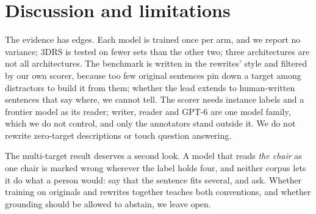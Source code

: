 \section{Discussion and limitations}
\label{sec:discussion}

The evidence has edges.
Each model is trained once per arm, and we report no variance; 3DRS is tested on fewer sets than the other two; three architectures are not all architectures.
The benchmark is written in the rewrites' style and filtered by our own scorer, because too few original sentences pin down a target among distractors to build it from them; whether the lead extends to human-written sentences that say where, we cannot tell.
The scorer needs instance labels and a frontier model as its reader; writer, reader and GPT-6 are one model family, which we do not control, and only the annotators stand outside it.
We do not rewrite zero-target descriptions or touch question answering.

The multi-target result deserves a second look.
A model that reads \emph{the chair} as one chair is marked wrong wherever the label holds four, and neither corpus lets it do what a person would: say that the sentence fits several, and ask.
Whether training on originals and rewrites together teaches both conventions, and whether grounding should be allowed to abstain, we leave open.

